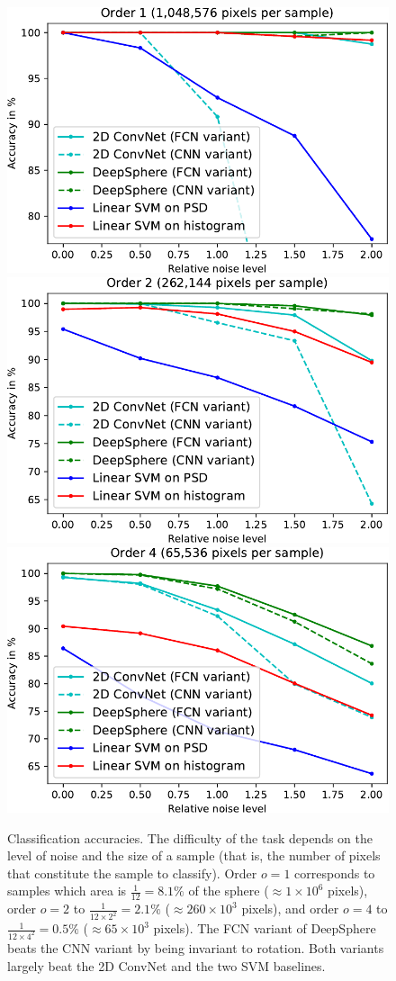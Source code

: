 \documentclass{article} %
\newcommand{\1}{\b{1}}              %
\newcommand{\0}{\b{0}}              %
\begin{document}
\begin{figure}[t!]
	\centering
	\includegraphics[width=0.32\linewidth]{result_order1}
	\hfill
	\includegraphics[width=0.32\linewidth]{result_order2}
	\hfill
	\includegraphics[width=0.32\linewidth]{result_order4}
	\caption{
		Classification accuracies.
		The difficulty of the task depends on the level of noise and the size of a sample (that is, the number of pixels that constitute the sample to classify). Order $o=1$ corresponds to samples which area is $\frac{1}{12}=8.1\%$ of the sphere ($\approx 1 \times 10^6$ pixels), order $o=2$ to $\frac{1}{12 \times 2^2} = 2.1\%$ ($\approx 260 \times 10^3$ pixels), and order $o=4$ to $\frac{1}{12 \times 4^2} = 0.5\%$ ($\approx 65 \times 10^3$ pixels).
		The FCN variant of DeepSphere beats the CNN variant by being invariant to rotation. Both variants largely beat the 2D ConvNet and the two SVM baselines.
	}
	\label{fig:results}
\end{figure}
\end{document}
